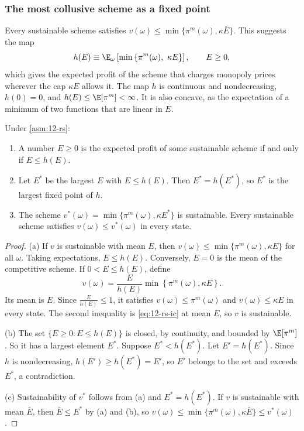 \subsubsection{The most collusive scheme as a fixed point}

Every sustainable scheme satisfies $v(\omega) \le \min\{\pi^m(\omega), \kappa\bar E\}$. This suggests the map
\begin{equation}\label{eq:12-rs-h}
h(E) \equiv \E_\omega\left[\min\left\{\pi^m(\omega),\ \kappa E\right\}\right], \qquad E \ge 0,
\end{equation}
which gives the expected profit of the scheme that charges monopoly prices wherever the cap $\kappa E$ allows it.
The map $h$ is continuous and nondecreasing, $h(0) = 0$, and $h(E) \le \E[\pi^m] < \infty$. It is also concave, as
the expectation of a minimum of two functions that are linear in $E$.

\begin{lemma}\label{lem:12-rs-fixed}
Under \cref{asm:12-rs}:
\begin{enumerate}[label=(\alph*)]
\item A number $E \ge 0$ is the expected profit of some sustainable scheme if and only if $E \le h(E)$.
\item Let $E^*$ be the largest $E$ with $E \le h(E)$. Then $E^* = h(E^*)$, so $E^*$ is the largest fixed point of $h$.
\item The scheme $v^*(\omega) = \min\{\pi^m(\omega), \kappa E^*\}$ is sustainable. Every sustainable scheme satisfies
$v(\omega) \le v^*(\omega)$ in every state.
\end{enumerate}
\end{lemma}

\begin{proof}
(a) If $v$ is sustainable with mean $E$, then $v(\omega) \le \min\{\pi^m(\omega), \kappa E\}$ for all $\omega$. Taking
expectations, $E \le h(E)$. Conversely, $E = 0$ is the mean of the competitive scheme. If $0 < E \le h(E)$, define
\begin{equation*}
v(\omega) = \frac{E}{h(E)}\min\left\{\pi^m(\omega), \kappa E\right\}.
\end{equation*}
Its mean is $E$. Since $\frac{E}{h(E)} \le 1$, it satisfies $v(\omega) \le \pi^m(\omega)$ and $v(\omega) \le \kappa E$ in every
state. The second inequality is \eqref{eq:12-rs-ic} at mean $E$, so $v$ is sustainable.

(b) The set $\{E \ge 0 : E \le h(E)\}$ is closed, by continuity, and bounded by $\E[\pi^m]$. So it has a largest element
$E^*$. Suppose $E^* < h(E^*)$. Let $E' = h(E^*)$. Since $h$ is nondecreasing, $h(E') \ge h(E^*) = E'$, so $E'$ belongs
to the set and exceeds $E^*$, a contradiction.

(c) Sustainability of $v^*$ follows from (a) and $E^* = h(E^*)$. If $v$ is sustainable with mean $\bar E$, then
$\bar E \le E^*$ by (a) and (b), so $v(\omega) \le \min\{\pi^m(\omega), \kappa\bar E\} \le v^*(\omega)$.
\end{proof}

